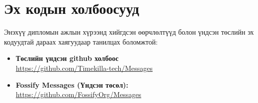 \chapter{Эх кодын холбоосууд}
\label{AppendixA}

Энэхүү дипломын ажлын хүрээнд хийгдсэн өөрчлөлтүүд болон үндсэн төслийн эх кодуудтай дараах хаягуудаар танилцах боломжтой:

\begin{itemize}
    \item \textbf{Төслийн үндсэн github холбоос} \\
    \url{https://github.com/Timekilla-tech/Messages}

    \item \textbf{Fossify Messages (Үндсэн төсөл):} \\
    \url{https://github.com/FossifyOrg/Messages}
\end{itemize}

\vspace{2em}
